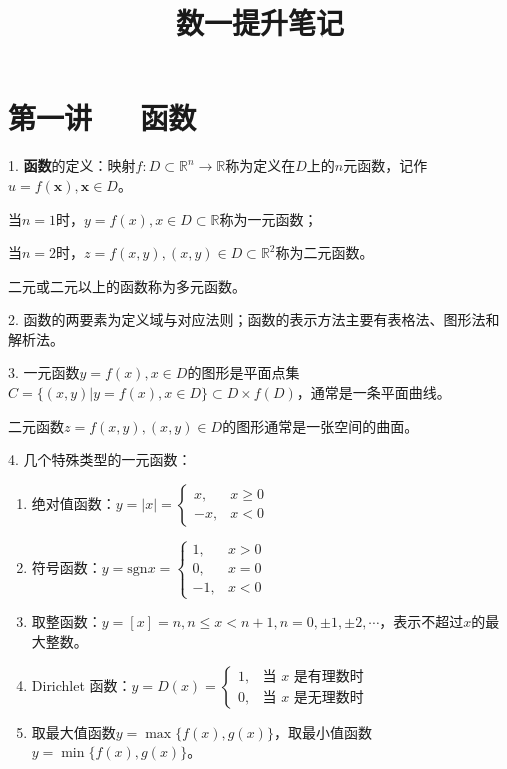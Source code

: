 \documentclass[UTF8]{ctexart}
\title{数一提升笔记}
\author{}
\date{}
\theoremstyle{remark}
\begin{document}
	\maketitle
	\tableofcontents
	\newpage
	
	\section{第一讲~~~函数}
	1. \textbf{函数}的定义：映射\(f:D\subset\mathbb{R}^n\rightarrow\mathbb{R}\)称为定义在\(D\)上的\(n\)元函数，记作\(u = f(\boldsymbol{x}),\boldsymbol{x}\in D\)。
	
	当\(n = 1\)时，\(y = f(x),x\in D\subset\mathbb{R}\)称为一元函数；
	
	当\(n = 2\)时，\(z = f(x,y),(x,y)\in D\subset\mathbb{R}^2\)称为二元函数。
	
	二元或二元以上的函数称为多元函数。
	
	2. 函数的两要素为定义域与对应法则；函数的表示方法主要有表格法、图形法和解析法。
	
	3. 一元函数\(y = f(x),x\in D\)的图形是平面点集\(C=\{(x,y)|y = f(x),x\in D\}\subset D\times f(D)\)，通常是一条平面曲线。
	
	二元函数\(z = f(x,y),(x,y)\in D\)的图形通常是一张空间的曲面。
	
	4. 几个特殊类型的一元函数：
	\begin{enumerate}
		\item 绝对值函数：\(y = |x|=\begin{cases}x, & x\geq0\\-x, & x<0\end{cases}\)
	\item 符号函数：\(y = \mathrm{sgn}x=\begin{cases}1, & x>0\\0, & x = 0\\-1, & x<0\end{cases}\)
	\item 取整函数：\(y = [x]=n,n\leq x < n + 1,n = 0,\pm1,\pm2,\cdots\)，表示不超过\(x\)的最大整数。
	\item Dirichlet 函数：\(y = D(x)=\begin{cases}1, & \text{当 }x\text{ 是有理数时}\\0, & \text{当 }x\text{ 是无理数时}\end{cases}\)
	\item 取最大值函数\(y = \max\{f(x),g(x)\}\)，取最小值函数\(y = \min\{f(x),g(x)\}\)。
	\end{enumerate}
	
\end{document}
